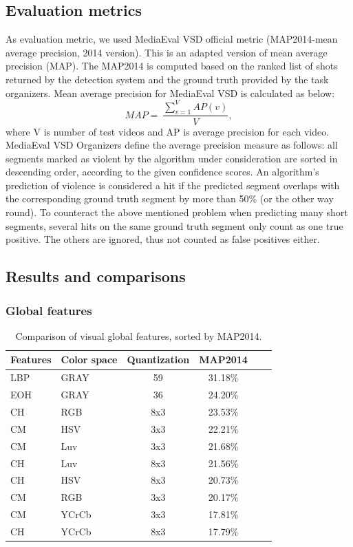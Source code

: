 \documentclass[twocolumn]{bmcart}%
\begin{document}
\subsection{Evaluation metrics}
As evaluation metric, we used MediaEval VSD official metric (MAP2014-mean average precision, 2014 version). This is an adapted version of mean average precision (MAP). The MAP2014 is computed based on the ranked list of shots returned by the detection system and the ground truth provided by the task organizers. Mean average precision for MediaEval VSD  is calculated as below:
\[
MAP=\ \frac{\sum_{v=1}^VAP(v)}{V},
\]
where V is number of test videos and AP is average precision for each video. MediaEval VSD Organizers define the average precision measure as follows: all segments marked as violent by the algorithm under consideration are sorted in descending order, according to the given confidence scores. An algorithm’s prediction of violence is considered a hit if the predicted segment overlaps with the corresponding ground truth segment by more than 50\% (or the other way round). To counteract the above mentioned problem when predicting many short segments, several hits on the same ground truth segment only count as one true positive. The others are ignored, thus not counted as false positives either.
\subsection{Results and comparisons}
\subsubsection{Global features}
\begin{table}
	\centering
	\caption{Comparison of visual global features, sorted by MAP2014.}
	\setlength{\tabcolsep}{4pt}
	\begin{tabular}{llcccc}
		\hline
		Features & Color space & Quantization & MAP2014 \\ \hline
		LBP & GRAY  & 59    & 31.18\% \\
		EOH & GRAY   & 36    & 24.20\% \\
		CH & RGB   & 8x3   & 23.53\% \\
		CM & HSV     & 3x3   & 22.21\% \\
		CM & Luv      & 3x3   & 21.68\% \\
		CH & Luv    & 8x3   & 21.56\% \\
		CH & HSV    & 8x3   & 20.73\%  \\
		CM & RGB     & 3x3   & 20.17\% \\
		CM & YCrCb   & 3x3   & 17.81\% \\
		CH & YCrCb   & 8x3   & 17.79\% \\ \hline
	\end{tabular}%
	\label{tab:global}%
\end{table}%
\end{document}
